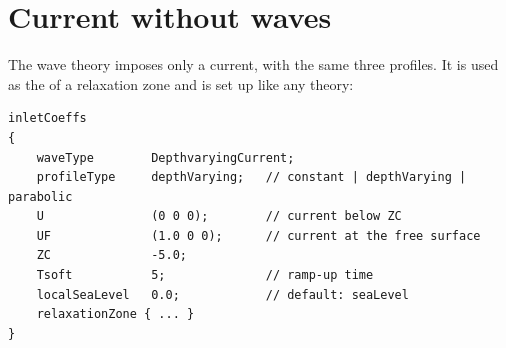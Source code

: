\section{Current without waves}
\label{sec:current-only}
The wave theory  imposes only a current, with the same three profiles.
It is used as the  of a relaxation zone and is set up like any \wtwof{} theory:
\begin{lstlisting}[caption={Current-only relaxation zone (\file{tutorials/CurrentWithProfile}).}]
inletCoeffs
{
    waveType        DepthvaryingCurrent;
    profileType     depthVarying;   // constant | depthVarying | parabolic
    U               (0 0 0);        // current below ZC
    UF              (1.0 0 0);      // current at the free surface
    ZC              -5.0;
    Tsoft           5;              // ramp-up time
    localSeaLevel   0.0;            // default: seaLevel
    relaxationZone { ... }
}
\end{lstlisting}
